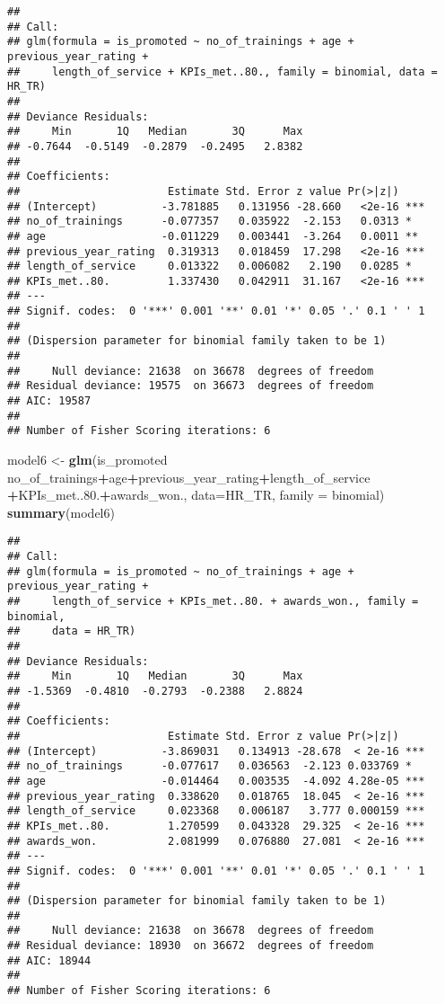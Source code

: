\documentclass[
]{article}
\newenvironment{Shaded}{\begin{snugshade}}{\end{snugshade}}
\newcommand{\DataTypeTok}[1]{\textcolor[rgb]{0.13,0.29,0.53}{#1}}
\newcommand{\FloatTok}[1]{\textcolor[rgb]{0.00,0.00,0.81}{#1}}
\newcommand{\KeywordTok}[1]{\textcolor[rgb]{0.13,0.29,0.53}{\textbf{#1}}}
\newcommand{\NormalTok}[1]{#1}
\newcommand{\OperatorTok}[1]{\textcolor[rgb]{0.81,0.36,0.00}{\textbf{#1}}}
\newcommand{\StringTok}[1]{\textcolor[rgb]{0.31,0.60,0.02}{#1}}
\begin{document}
\begin{verbatim}
## 
## Call:
## glm(formula = is_promoted ~ no_of_trainings + age + previous_year_rating + 
##     length_of_service + KPIs_met..80., family = binomial, data = HR_TR)
## 
## Deviance Residuals: 
##     Min       1Q   Median       3Q      Max  
## -0.7644  -0.5149  -0.2879  -0.2495   2.8382  
## 
## Coefficients:
##                       Estimate Std. Error z value Pr(>|z|)    
## (Intercept)          -3.781885   0.131956 -28.660   <2e-16 ***
## no_of_trainings      -0.077357   0.035922  -2.153   0.0313 *  
## age                  -0.011229   0.003441  -3.264   0.0011 ** 
## previous_year_rating  0.319313   0.018459  17.298   <2e-16 ***
## length_of_service     0.013322   0.006082   2.190   0.0285 *  
## KPIs_met..80.         1.337430   0.042911  31.167   <2e-16 ***
## ---
## Signif. codes:  0 '***' 0.001 '**' 0.01 '*' 0.05 '.' 0.1 ' ' 1
## 
## (Dispersion parameter for binomial family taken to be 1)
## 
##     Null deviance: 21638  on 36678  degrees of freedom
## Residual deviance: 19575  on 36673  degrees of freedom
## AIC: 19587
## 
## Number of Fisher Scoring iterations: 6
\end{verbatim}

\begin{Shaded}
\begin{Highlighting}[]
\NormalTok{model6 <-}\StringTok{ }\KeywordTok{glm}\NormalTok{(is_promoted }\OperatorTok{~}\StringTok{ }\NormalTok{no_of_trainings}\OperatorTok{+}\NormalTok{age}\OperatorTok{+}\NormalTok{previous_year_rating}\OperatorTok{+}\NormalTok{length_of_service}
              \OperatorTok{+}\NormalTok{KPIs_met..}\FloatTok{80.}\OperatorTok{+}\NormalTok{awards_won., }
              \DataTypeTok{data=}\NormalTok{HR_TR, }\DataTypeTok{family =}\NormalTok{ binomial)}
\KeywordTok{summary}\NormalTok{(model6)}
\end{Highlighting}
\end{Shaded}

\begin{verbatim}
## 
## Call:
## glm(formula = is_promoted ~ no_of_trainings + age + previous_year_rating + 
##     length_of_service + KPIs_met..80. + awards_won., family = binomial, 
##     data = HR_TR)
## 
## Deviance Residuals: 
##     Min       1Q   Median       3Q      Max  
## -1.5369  -0.4810  -0.2793  -0.2388   2.8824  
## 
## Coefficients:
##                       Estimate Std. Error z value Pr(>|z|)    
## (Intercept)          -3.869031   0.134913 -28.678  < 2e-16 ***
## no_of_trainings      -0.077617   0.036563  -2.123 0.033769 *  
## age                  -0.014464   0.003535  -4.092 4.28e-05 ***
## previous_year_rating  0.338620   0.018765  18.045  < 2e-16 ***
## length_of_service     0.023368   0.006187   3.777 0.000159 ***
## KPIs_met..80.         1.270599   0.043328  29.325  < 2e-16 ***
## awards_won.           2.081999   0.076880  27.081  < 2e-16 ***
## ---
## Signif. codes:  0 '***' 0.001 '**' 0.01 '*' 0.05 '.' 0.1 ' ' 1
## 
## (Dispersion parameter for binomial family taken to be 1)
## 
##     Null deviance: 21638  on 36678  degrees of freedom
## Residual deviance: 18930  on 36672  degrees of freedom
## AIC: 18944
## 
## Number of Fisher Scoring iterations: 6
\end{verbatim}
\end{document}
